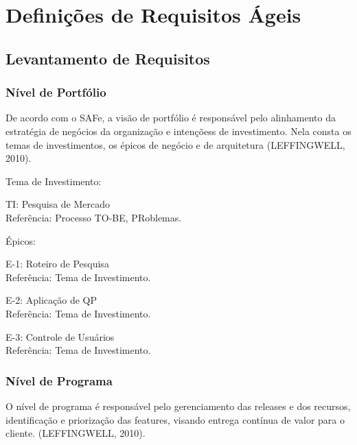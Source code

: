 \section{Definições de Requisitos Ágeis}
	
	\subsection{Levantamento de Requisitos}

		\subsubsection{Nível de Portfólio}

			De acordo com o SAFe, a visão de portfólio é responsável pelo alinhamento da estratégia de negócios da organização e intençõess de investimento. Nela consta os temas de investimentos, os épicos de negócio e de arquitetura (LEFFINGWELL, 2010). 

			\begin{itemize}
			{
				\item Tema de Investimento:
				\begin{itemize}
				{
					\item TI: Pesquisa de Mercado\\
					Referência: Processo TO-BE, PRoblemas.
				}
				\end{itemize}

				\item Épicos:
				\begin{itemize}
				{
					\item E-1: Roteiro de Pesquisa\\
					Referência: Tema de Investimento.

					\item E-2: Aplicação de QP\\
					Referência: Tema de Investimento.

					\item E-3: Controle de Usuários\\
					Referência: Tema de Investimento.
				}
				\end{itemize}
			}
			\end{itemize}


		\subsubsection{Nível de Programa}

			O nível de programa é responsável pelo gerenciamento das releases e dos recursos, identificação e priorização das features, visando entrega contínua de valor para o cliente. (LEFFINGWELL, 2010).

